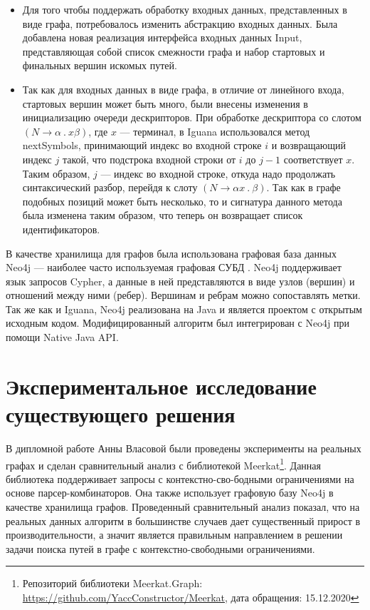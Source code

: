 \documentclass[14pt]{matmex-diploma-custom}
\theoremstyle{definition}
\begin{document}
\begin{itemize}
    \item Для того чтобы поддержать обработку входных данных, представленных в виде графа, потребовалось изменить абстракцию входных данных. Была добавлена новая реализация интерфейса входных данных Input, представляющая собой список смежности графа и набор стартовых и финальных вершин искомых путей.
    \item Так как для входных данных в виде графа, в отличие от линейного входа, стартовых вершин может быть много, были внесены изменения в инициализацию очереди дескрипторов. При обработке дескриптора со слотом $(N \rightarrow \alpha ~. ~x \beta)$, где $x$ --- терминал, в Iguana использовался метод nextSymbols, принимающий индекс во входной строке $i$ и возвращающий индекс $j$ такой, что подстрока входной строки от $i$ до $j − 1$ соответствует $x$. Таким образом, $j$ --- индекс во входной строке, откуда надо продолжать синтаксический разбор, перейдя к слоту $(N \rightarrow \alpha x~. ~ \beta)$. Так как в графе подобных позиций может быть несколько, то и сигнатура данного метода была изменена таким образом, что теперь он возвращает список идентификаторов.
\end{itemize}

В качестве хранилища для графов была использована графовая база данных Neo4j --- наиболее часто используемая графовая СУБД \cite{neo4j}. Neo4j поддерживает язык запросов Cypher, а данные в ней представляются в виде узлов (вершин) и отношений между ними (ребер). Вершинам и ребрам можно сопоставлять метки. Так же как и Iguana, Neo4j реализована на Java и является проектом с открытым исходным кодом.
Модифицированный алгоритм был интегрирован с Neo4j при помощи Native Java API.

\section{Экспериментальное исследование существующего решения}
В дипломной работе Анны Власовой были проведены эксперименты на реальных графах и сделан сравнительный анализ с библиотекой Meerkat\footnote{Репозиторий библиотеки Meerkat.Graph: \url{https://github.com/YaccConstructor/Meerkat}, дата обращения: 15.12.2020}. Данная библиотека поддерживает запросы с контекстно-сво-бодными ограничениями на основе парсер-комбинаторов. Она также использует графовую базу Neo4j в качестве хранилища графов.
Проведенный сравнительный анализ показал, что на реальных данных алгоритм в большинстве случаев дает существенный прирост в производительности, а значит является правильным направлением в решении задачи поиска путей в графе с контекстно-свободными ограничениями.
\end{document}
